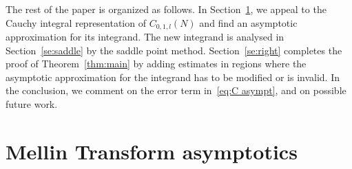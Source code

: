 \documentclass[a4paper]{amsart}
\begin{document}
The rest of the paper is organized as follows. In Section~\ref{se:mellin},
we appeal to the Cauchy integral representation of $C_{0,1,l}(N)$
and find an asymptotic approximation for its integrand.
The new integrand is analysed in Section~\ref{se:saddle}
by the saddle point method. Section~\ref{se:right} completes the proof
of Theorem~\ref{thm:main} by adding estimates in regions
where the asymptotic approximation for the integrand has to be
modified or is invalid. In the conclusion, we comment on the error term
in~\eqref{eq:C asympt}, and on possible future work.



\section{Mellin Transform asymptotics}\label{se:mellin}
\end{document}
